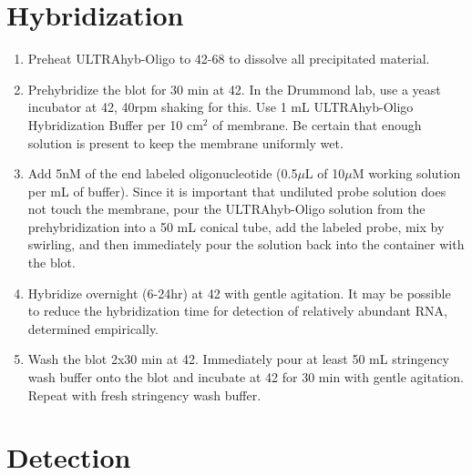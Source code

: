 \documentclass{article}
\newcommand{\mul}{\ensuremath{\mu}L\xspace}
\newcommand{\muM}{\ensuremath{\mu}M\xspace}
\newcommand{\degC}{\celsius\xspace}
\begin{document}
\section*{Hybridization}

\begin{enumerate}[resume]
\item Preheat ULTRAhyb-Oligo to 42-68\degC to dissolve all precipitated material. \label{step:prehyb}
\item Prehybridize the blot for 30 min at 42\degC. In the Drummond lab, use a yeast incubator at 42\degC, 40rpm shaking for this.
Use 1 mL ULTRAhyb-Oligo Hybridization Buffer per 10 cm$^2$ of membrane. Be certain that enough solution is present to keep the membrane uniformly wet.
\item Add 5nM of the end labeled oligonucleotide (0.5\mul of 10\muM working solution per mL of buffer). 
Since it is important that undiluted probe solution does not touch the membrane, pour the ULTRAhyb-Oligo solution from the prehybridization into a 50 mL conical tube, add the labeled probe, mix by swirling, and then immediately pour the solution back into the container with the blot.
\item Hybridize overnight (6-24hr) at 42\degC with gentle agitation. It may be possible to reduce the hybridization time for detection of relatively abundant RNA, determined empirically.
\item Wash the blot 2x30 min at 42\degC. Immediately pour at least 50 mL stringency wash buffer onto the blot and incubate at 42\degC for 30 min with gentle agitation. Repeat with fresh stringency wash buffer.
\end{enumerate}

\section*{Detection}
\label{sec:detect}

\end{document}
